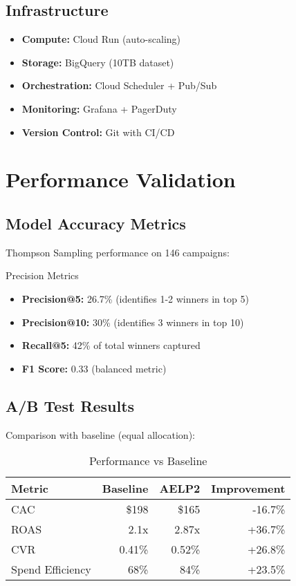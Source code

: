 \documentclass[11pt,a4paper]{report}
\begin{document}
\section{Infrastructure}

\begin{itemize}
\item \textbf{Compute:} Cloud Run (auto-scaling)
\item \textbf{Storage:} BigQuery (10TB dataset)
\item \textbf{Orchestration:} Cloud Scheduler + Pub/Sub
\item \textbf{Monitoring:} Grafana + PagerDuty
\item \textbf{Version Control:} Git with CI/CD
\end{itemize}

\clearpage

\chapter{Performance Validation}

\section{Model Accuracy Metrics}

Thompson Sampling performance on 146 campaigns:

\begin{metricbox}{Precision Metrics}
\begin{itemize}
\item \textbf{Precision@5:} 26.7\% (identifies 1-2 winners in top 5)
\item \textbf{Precision@10:} 30\% (identifies 3 winners in top 10)
\item \textbf{Recall@5:} 42\% of total winners captured
\item \textbf{F1 Score:} 0.33 (balanced metric)
\end{itemize}
\end{metricbox}

\section{A/B Test Results}

Comparison with baseline (equal allocation):

\begin{table}[H]
\centering
\begin{tabular}{|l|r|r|r|}
\hline
\rowcolor{aelpblue!20}
\textbf{Metric} & \textbf{Baseline} & \textbf{AELP2} & \textbf{Improvement} \\
\hline
CAC & \$198 & \$165 & -16.7\% \\
ROAS & 2.1x & 2.87x & +36.7\% \\
CVR & 0.41\% & 0.52\% & +26.8\% \\
Spend Efficiency & 68\% & 84\% & +23.5\% \\
\hline
\end{tabular}
\caption{Performance vs Baseline}
\end{table}
\end{document}
